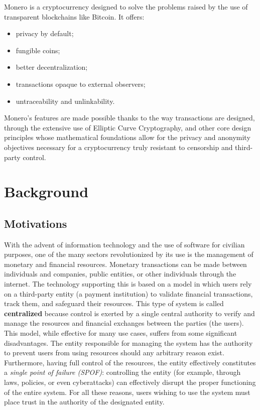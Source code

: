 \documentclass[conference]{IEEEtran}
\begin{document}
Monero is a cryptocurrency designed to solve the problems raised by the use of transparent blockchains like Bitcoin. It offers:
\begin{itemize}
    \item privacy by default;
    \item fungible coins;
    \item better decentralization;
    \item transactions opaque to external observers;
    \item untraceability and unlinkability.
\end{itemize}
Monero's features are made possible thanks to the way transactions are designed, through the extensive use of Elliptic Curve Cryptography, and other core design principles whose mathematical foundations allow for the privacy and anonymity objectives necessary for a cryptocurrency truly resistant to censorship and third-party control.



\section{Background}
\subsection{Motivations}
With the advent of information technology and the use of software for civilian purposes, one of the many sectors revolutionized by its use is the management of monetary and financial resources. Monetary transactions can be made between individuals and companies, public entities, or other individuals through the internet. The technology supporting this is based on a model in which users rely on a third-party entity (a payment institution) to validate financial transactions, track them, and safeguard their resources. This type of system is called \textbf{centralized} because control is exerted by a single central authority to verify and manage the resources and financial exchanges between the parties (the users).\\
This model, while effective for many use cases, suffers from some significant disadvantages. The entity responsible for managing the system has the authority to prevent users from using resources should any arbitrary reason exist. Furthermore, having full control of the resources, the entity effectively constitutes a \textit{single point of failure (SPOF)}: controlling the entity (for example, through laws, policies, or even cyberattacks) can effectively disrupt the proper functioning of the entire system. For all these reasons, users wishing to use the system must place trust in the authority of the designated entity.
\end{document}

